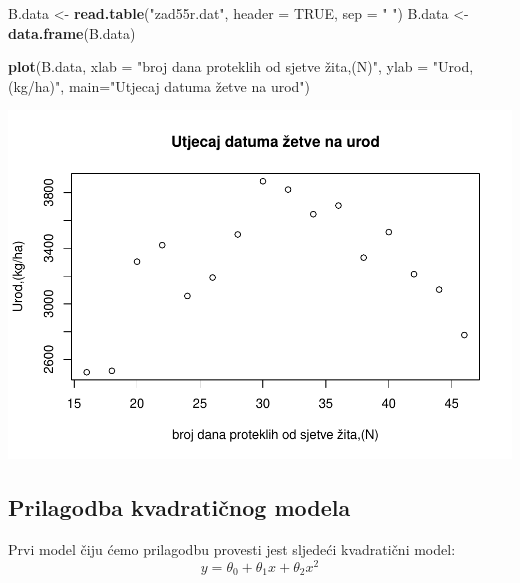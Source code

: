 \documentclass[]{article}
\newenvironment{Shaded}{\begin{snugshade}}{\end{snugshade}}
\newcommand{\KeywordTok}[1]{\textcolor[rgb]{0.13,0.29,0.53}{\textbf{{#1}}}}
\newcommand{\DataTypeTok}[1]{\textcolor[rgb]{0.13,0.29,0.53}{{#1}}}
\newcommand{\DecValTok}[1]{\textcolor[rgb]{0.00,0.00,0.81}{{#1}}}
\newcommand{\StringTok}[1]{\textcolor[rgb]{0.31,0.60,0.02}{{#1}}}
\newcommand{\OtherTok}[1]{\textcolor[rgb]{0.56,0.35,0.01}{{#1}}}
\newcommand{\NormalTok}[1]{{#1}}
\begin{document}
\begin{Shaded}
\begin{Highlighting}[]
\NormalTok{B.data <-}\StringTok{ }\KeywordTok{read.table}\NormalTok{(}\StringTok{"zad55r.dat"}\NormalTok{, }\DataTypeTok{header =} \OtherTok{TRUE}\NormalTok{, }\DataTypeTok{sep =} \StringTok{" "}\NormalTok{)}
\NormalTok{B.data <-}\StringTok{ }\KeywordTok{data.frame}\NormalTok{(B.data)}

\KeywordTok{plot}\NormalTok{(B.data, }\DataTypeTok{xlab =} \StringTok{"broj dana proteklih od sjetve žita,(N)"}\NormalTok{, }\DataTypeTok{ylab =} \StringTok{"Urod,(kg/ha)"}\NormalTok{, }\DataTypeTok{main=}\StringTok{"Utjecaj datuma žetve na urod"}\NormalTok{)}
\end{Highlighting}
\end{Shaded}

\includegraphics{Izvjestaj_files/figure-latex/unnamed-chunk-16-1.pdf}

\subsection{Prilagodba kvadratičnog
modela}\label{prilagodba-kvadraticnog-modela-1}

Prvi model čiju ćemo prilagodbu provesti jest sljedeći kvadratični
model: \[y = \theta_0 + \theta_1 x + \theta_2 x^2\]

\begin{Shaded}
\end{Shaded}
\end{document}
